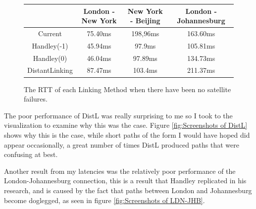 \documentclass[12pt]{report}
\begin{document}
\begin{figure}
\begin{center}
\caption{The RTT of each Linking Method when there have been no satellite failures.}
\label{fig:Latencies}
\begin{tabular}{ | c | c  | c  | c |}
	\hline
	& London - New York & New York - Beijing & London - Johannesburg \\
	\hline
	Current\cite{Pings} & 75.40ms & 198,96ms\footnotemark & 163.60ms\\
	Handley(-1) & 45.94ms & 97.9ms & 105.81ms\\
	Handley(0) & 46.04ms & 97.89ms & 134.73ms\\
	DistantLinking  & 87.47ms & 103.4ms & 211.37ms\\
	\hline
\end{tabular}
\end{center}
\end{figure}

The poor performance of DistL was really surprising to me so I took to the visualization to examine why this was the case. Figure \ref{fig:Screenshots of DistL} shows why this is the case, while short paths of the form I would have hoped did appear occasionally, a great number of times DistL produced paths that were confusing at best.

Another result from my latencies was the relatively poor performance of the London-Johannesburg connection, this is a result that Handley replicated in his research, and is caused by the fact that paths between London and Johannesburg become doglegged, as seen in figure \ref{fig:Screenshots of LDN-JHB}.

\end{document}
